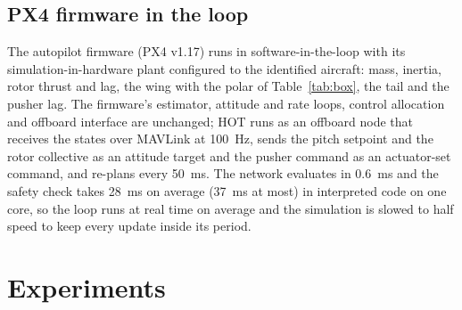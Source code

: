 \documentclass[final,5p,times,twocolumn]{elsarticle}
\newcommand{\hotCheckMaxMs}{37}
\newcommand{\hotCheckMs}{28}
\newcommand{\hotEvalMs}{0.6}
\begin{document}
\subsection{PX4 firmware in the loop}
The autopilot firmware (PX4 v1.17) runs in software-in-the-loop with its simulation-in-hardware plant configured to the identified aircraft: mass, inertia, rotor thrust and lag, the wing with the polar of Table~\ref{tab:box}, the tail and the pusher lag. The firmware's estimator, attitude and rate loops, control allocation and offboard interface are unchanged; HOT runs as an offboard node that receives the states over MAVLink at \SI{100}{Hz}, sends the pitch setpoint and the rotor collective as an attitude target and the pusher command as an actuator-set command, and re-plans every \SI{50}{ms}. The network evaluates in \hotEvalMs{}~ms and the safety check takes \hotCheckMs{}~ms on average (\hotCheckMaxMs{}~ms at most) in interpreted code on one core, so the loop runs at real time on average and the simulation is slowed to half speed to keep every update inside its period.



\section{Experiments}\label{sec:experiments}
\end{document}
